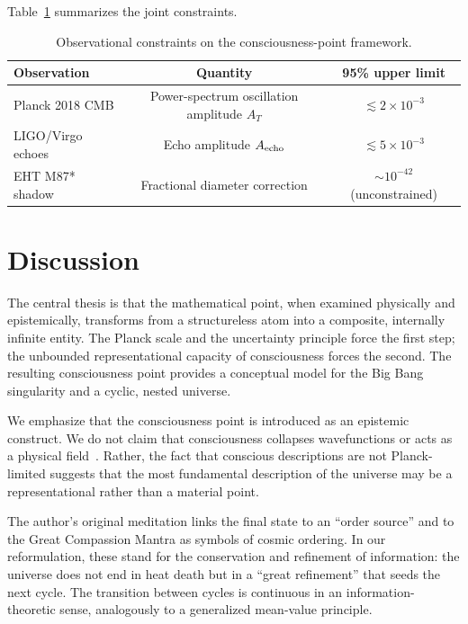 \documentclass[11pt,a4paper]{article}
\theoremstyle{plain}
\begin{document}
Table~\ref{tab:constraints} summarizes the joint constraints.

\begin{table}[htbp]
\centering
\caption{Observational constraints on the consciousness-point framework.}
\label{tab:constraints}
\begin{tabular}{@{}lcc@{}}
\toprule
Observation & Quantity & 95\% upper limit\\
\midrule
Planck 2018 CMB & Power-spectrum oscillation amplitude $A_T$ & $\lesssim 2\times10^{-3}$\\
LIGO/Virgo echoes & Echo amplitude $A_{\rm echo}$ & $\lesssim 5\times10^{-3}$\\
EHT M87* shadow & Fractional diameter correction & $\sim10^{-42}$ (unconstrained)\\
\bottomrule
\end{tabular}
\end{table}

\section{Discussion}

The central thesis is that the mathematical point, when examined physically and epistemically, transforms from a structureless atom into a composite, internally infinite entity. The Planck scale and the uncertainty principle force the first step; the unbounded representational capacity of consciousness forces the second. The resulting consciousness point provides a conceptual model for the Big Bang singularity and a cyclic, nested universe.

We emphasize that the consciousness point is introduced as an epistemic construct. We do not claim that consciousness collapses wavefunctions or acts as a physical field~\cite{chalmers1996,tononi2016}. Rather, the fact that conscious descriptions are not Planck-limited suggests that the most fundamental description of the universe may be a representational rather than a material point.

The author's original meditation links the final state to an ``order source'' and to the Great Compassion Mantra as symbols of cosmic ordering. In our reformulation, these stand for the conservation and refinement of information: the universe does not end in heat death but in a ``great refinement'' that seeds the next cycle. The transition between cycles is continuous in an information-theoretic sense, analogously to a generalized mean-value principle.
\end{document}
